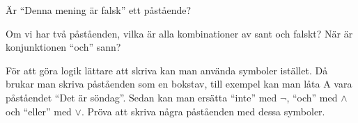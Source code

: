 \begin{problem}[Extra]
	Är ``Denna mening är falsk'' ett påstående?
\end{problem}

\begin{problem}[Extra]
	Om vi har två påståenden, vilka är alla kombinationer av sant och falskt? När är konjunktionen ``och'' sann?
\end{problem}

\begin{problem}[Extra]
	För att göra logik lättare att skriva kan man använda symboler istället. Då brukar man skriva påståenden som en bokstav, till exempel kan man låta A vara påståendet ``Det är söndag''. Sedan kan man ersätta ``inte'' med \(\lnot\), ``och'' med \(\land\) och ``eller'' med \(\lor\). Pröva att skriva några påståenden med dessa symboler.
\end{problem}










